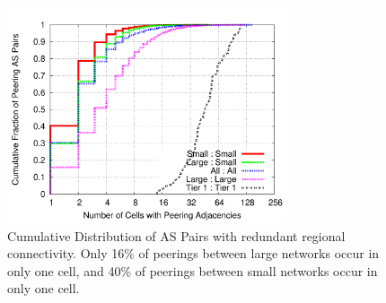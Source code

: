 \begin{figure}[tb]
\centering
\includegraphics[width=3.25in]{peering}
\caption[]{\label{fig:peering_redundancy} Cumulative Distribution of AS Pairs with redundant regional connectivity. Only 16\% of peerings between large networks occur in only one cell, and 40\% of peerings between small networks occur in only one cell.} 
\end{figure}

